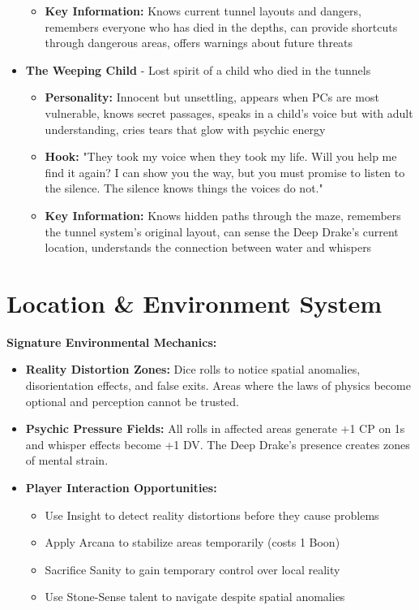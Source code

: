 \documentclass[11pt]{article}
\begin{document}
\begin{itemize}
\begin{itemize}
  \item \textbf{Key Information:} Knows current tunnel layouts and dangers, remembers everyone who has died in the depths, can provide shortcuts through dangerous areas, offers warnings about future threats
  \end{itemize}
\item \textbf{The Weeping Child} - Lost spirit of a child who died in the tunnels
  \begin{itemize}
  \item \textbf{Personality:} Innocent but unsettling, appears when PCs are most vulnerable, knows secret passages, speaks in a child's voice but with adult understanding, cries tears that glow with psychic energy
  \item \textbf{Hook:} "They took my voice when they took my life. Will you help me find it again? I can show you the way, but you must promise to listen to the silence. The silence knows things the voices do not."
  \item \textbf{Key Information:} Knows hidden paths through the maze, remembers the tunnel system's original layout, can sense the Deep Drake's current location, understands the connection between water and whispers
  \end{itemize}
\end{itemize}

\section{Location \& Environment System}

\textbf{Signature Environmental Mechanics:}
\begin{itemize}
\item \textbf{Reality Distortion Zones:} Dice rolls to notice spatial anomalies, disorientation effects, and false exits. Areas where the laws of physics become optional and perception cannot be trusted.
\item \textbf{Psychic Pressure Fields:} All rolls in affected areas generate +1 CP on 1s and whisper effects become +1 DV. The Deep Drake's presence creates zones of mental strain.
\item \textbf{Player Interaction Opportunities:}
  \begin{itemize}
  \item Use Insight to detect reality distortions before they cause problems
  \item Apply Arcana to stabilize areas temporarily (costs 1 Boon)
  \item Sacrifice Sanity to gain temporary control over local reality
  \item Use Stone-Sense talent to navigate despite spatial anomalies
  \end{itemize}
\end{itemize}
\end{document}
